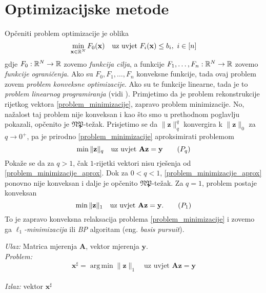\documentclass[a4paper,twoside,12pt]{memoir} %
\newcommand{\vect}[1]{\mathbf{#1}}
\renewcommand{\vec}{\vect}
\newcommand{\norm}[1]{\|{#1}\|}
\DeclareMathOperator*{\argmin}{arg\,min}
\newenvironment{alg}[1]
{
    \bigskip
    \begin{tcolorbox}[arc=0mm,boxrule=1.2pt,colframe=black,colback=white,detach title, before upper={\medskip\begin{center}\textbf{#1}\end{center}\hline\newline\medskip},frame hidden]
    \medskip
}
{
    \medskip
\end{tcolorbox}
    \bigskip
}
\begin{document}
\section[Optimizacijske metode][Optimizacijske metode]{Optimizacijske metode}
Op\v{c}eniti problem optimizacije je oblika
\begin{equation*}
    \min_{\vec x \in \R^N} F_0(\vec x)\quad\text{uz uvjet }F_i(\vec x) \leq b_i,\ i \in [n]
\end{equation*}
gdje $F_0:\mathbb{R}^N \rightarrow \mathbb{R}$ zovemo \textit{funkcija cilja}, a funkcije $F_1, \dots, F_n: \mathbb{R}^N \rightarrow \mathbb{R}$ zovemo \textit{funkcije ograni\v{c}enja}. Ako su $F_0, F_1, \dots, F_n$ konveksne funkcije, tada ovaj problem zovem \textit{problem konveksne optimizacije}. Ako su te funkcije linearne, tada je to \textit{problem linearnog programiranja} (vidi \cite{chong2013introduction}). Primjetimo da je problem rekonstrukcije rijetkog vektora \eqref{problem_minimizacije}, zapravo problem minimizacije. No, na\v{z}alost taj problem nije konveksan i kao \v{s}to smo u prethodnom poglavlju pokazali, op\v{c}enito je $\mathfrak{NP}$-te\v{z}ak. Prisjetimo se da $\norm{\vec z}_q^q$ konvergira k $\norm{\vec z}_0$ za $q \rightarrow 0^+$, pa je prirodno  \eqref{problem_minimizacije} aproksimirati problemom
\begin{equation}
    \min \norm{\vec z}_q\quad\text{uz uvjet }\vec{Az}=\vec y\tag{$P_{q}$}\label{problem_minimizacije_aprox}
\end{equation}
Poka\v{z}e se da za $q > 1$, \v{c}ak $1$-rijetki vektori nisu rje\v{s}enja od \eqref{problem_minimizacije_aprox}. Dok za $0 < q < 1$, \eqref{problem_minimizacije_aprox} ponovno nije konveksan i dalje je op\v{c}enito $\mathfrak{NP}$-te\v{z}ak. Za $q=1$, problem postaje konveksan
\begin{equation}
    \min \norm{\vec z}_1 \quad \text{uz uvjet }\vec{Az}=\vec y.\tag{$P_{1}$}\label{problem_minimizacije_l1}
\end{equation}
To je zapravo konveksna relaksacija problema \eqref{problem_minimizacije} i zovemo ga $\ell_1$\textit{-minimizacija} ili \textit{BP} algoritam (eng. \textit{basis pursuit}).

\begin{alg}{$\ell_1$-minimizacija (BP)}
    \textit{Ulaz:} Matrica mjerenja $\vec A$, vektor mjerenja $\vec y$. \\
    \textit{Problem:}
        \begin{equation}
            \vec x^{\sharp} = \argmin \norm{\vec z}_1 \quad \text{uz uvjet }\vec{Az}=\vec y\tag{$\ell_1-min$}\label{algoritam_l1_minimizacija}
        \end{equation} \\
        \textit{Izlaz:} vektor $\vec x^{\sharp}$
\end{alg}
\end{document}
